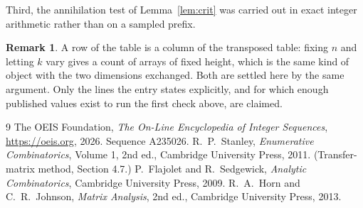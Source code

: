 \documentclass[11pt,a4paper]{article}
\theoremstyle{plain}
\theoremstyle{definition}
\newtheorem{remark}[theorem]{Remark}
\begin{document}
Third, the annihilation test of Lemma~\ref{lem:crit} was carried out in exact integer
arithmetic rather than on a sampled prefix.

\begin{remark}
A row of the table is a column of the transposed table: fixing $n$ and letting $k$ vary gives a
count of arrays of fixed height, which is the same kind of object with the two dimensions
exchanged. Both are settled here by the same argument. Only the lines the entry states
explicitly, and for which enough published values exist to run the first check above, are
claimed.
\end{remark}

\begin{thebibliography}{9}
 The OEIS Foundation, \emph{The On-Line Encyclopedia of Integer
Sequences}, \url{https://oeis.org}, 2026. Sequence A235026.
 R.~P.~Stanley, \emph{Enumerative Combinatorics}, Volume 1, 2nd ed.,
Cambridge University Press, 2011. (Transfer-matrix method, Section 4.7.)
 P.~Flajolet and R.~Sedgewick, \emph{Analytic Combinatorics}, Cambridge
University Press, 2009.
 R.~A.~Horn and C.~R.~Johnson, \emph{Matrix Analysis}, 2nd ed., Cambridge
University Press, 2013.
\end{thebibliography}
\end{document}
